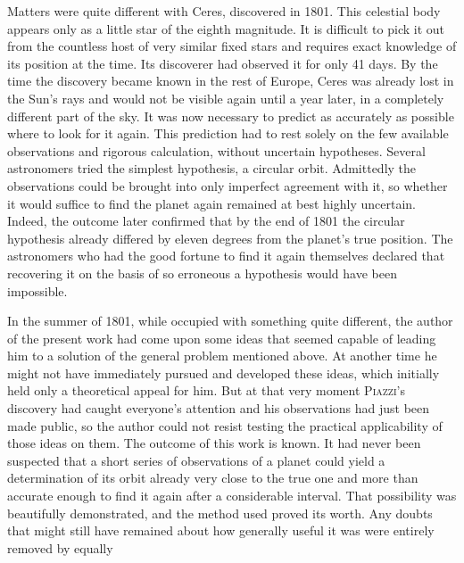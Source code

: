 Matters were quite different with Ceres, discovered in 1801. This celestial body appears only as a little star of the eighth magnitude. It is difficult to pick it out from the countless host of very similar fixed stars and requires exact knowledge of its position at the time. Its discoverer had observed it for only 41 days. By the time the discovery became known in the rest of Europe, Ceres was already lost in the Sun’s rays and would not be visible again until a year later, in a completely different part of the sky. It was now necessary to predict as accurately as possible where to look for it again. This prediction had to rest solely on the few available observations and rigorous calculation, without uncertain hypotheses. Several astronomers tried the simplest hypothesis, a circular orbit. Admittedly the observations could be brought into only imperfect agreement with it, so whether it would suffice to find the planet again remained at best highly uncertain. Indeed, the outcome later confirmed that by the end of 1801 the circular hypothesis already differed by eleven degrees from the planet’s true position. The astronomers who had the good fortune to find it again themselves declared that recovering it on the basis of so erroneous a hypothesis would have been impossible.

In the summer of 1801, while occupied with something quite different, the author of the present work had come upon some ideas that seemed capable of leading him to a solution of the general problem mentioned above. At another time he might not have immediately pursued and developed these ideas, which initially held only a theoretical appeal for him. But at that very moment \textsc{Piazzi}’s discovery had caught everyone’s attention and his observations had just been made public, so the author could not resist testing the practical applicability of those ideas on them. The outcome of this work is known. It had never been suspected that a short series of observations of a planet could yield a determination of its orbit already very close to the true one and more than accurate enough to find it again after a considerable interval. That possibility was beautifully demonstrated, and the method used proved its worth. Any doubts that might still have remained about how generally useful it was were entirely removed by equally
